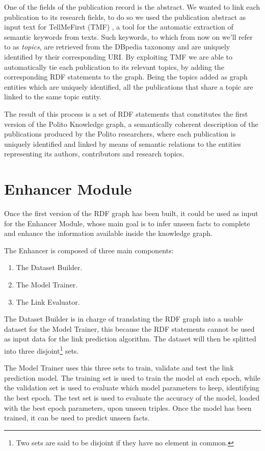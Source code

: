 \documentclass[%
    corpo=13.5pt,
    twoside,
    oldstyle,
    tipotesi=magistrale,
    greek,
    evenboxes
]{toptesi}
\begin{document}
One of the fields of the publication record is the abstract. We wanted to
link each publication to its research fields, to do so we used the publication abstract
as input text for TellMeFirst (TMF) \cite{rocha2015}, a tool for the automatic
extraction of semantic keywords from texts. Such keywords, to which from now
on we'll refer to as \emph{topics}, are retrieved from the DBpedia taxonomy
and are uniquely identified by their corresponding URI.
By exploiting TMF we are able to automatically tie each publication to
its relevant topics, by adding the corresponding RDF statements to the graph.
Being the topics added as graph entities which are uniquely identified, all the
publications that share a topic are linked to the same topic entity.

The result of this process is a set of RDF statements that constitutes the
first version of the Polito Knowledge graph, a semantically coherent description
of the publications produced by the Polito researchers, where each
publication is uniquely identified and linked by means of semantic relations
to the entities representing its authors, contributors and research topics.


\section{Enhancer Module}

Once the first version of the RDF graph has been built, it could be used as
input for the Enhancer Module, whose main goal is to infer unseen facts to
complete and enhance the information available inside the knowledge graph.
\newline

The Enhancer is composed of three main components:

\begin{enumerate}
    \item The Dataset Builder.
    \item The Model Trainer.
    \item The Link Evaluator.
\end{enumerate}

The Dataset Builder is in charge of translating the RDF graph into a usable
dataset for the Model Trainer, this because the RDF statements cannot be used as
input data for the link prediction algorithm.
The dataset will then be splitted into three disjoint\footnote{Two sets are said
to be disjoint if they have no element in common.}
sets.

The Model Trainer uses this three sets to train, validate and test the link
prediction model.
The training set is used to train the model at each epoch, while the validation set
is used to evaluate which model parameters to keep, identifying the best epoch.
The test set is used to evaluate the accuracy of the model, loaded with the best
epoch parameters, upon unseen triples. Once the model has been trained, it can
be used to predict unseen facts.
\end{document}
